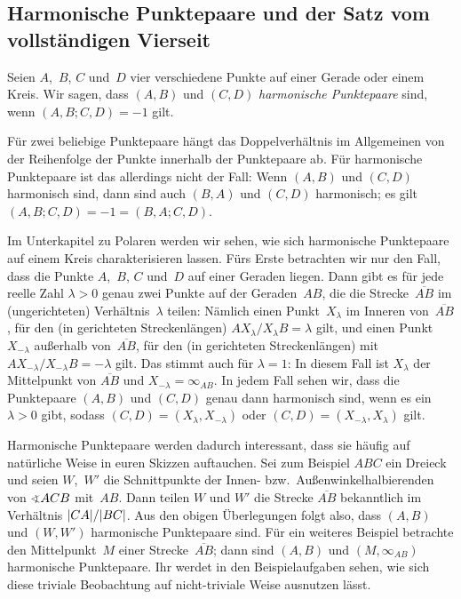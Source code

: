 \subsection*{Harmonische Punktepaare und der Satz vom vollständigen Vierseit}
\begin{definition}
	Seien $A$,~$B$, $C$ und~$D$ vier verschiedene Punkte auf einer Gerade oder einem Kreis. Wir sagen, dass $(A,B)$ und $(C,D)$ \emph{harmonische Punktepaare} sind, wenn $(A,B;C,D)=-1$ gilt.
\end{definition}

Für zwei beliebige Punktepaare hängt das Doppelverhältnis im Allgemeinen von der Reihenfolge der Punkte innerhalb der Punktepaare ab. Für harmonische Punktepaare ist das allerdings nicht der Fall: Wenn $(A,B)$ und $(C,D)$ harmonisch sind, dann sind auch $(B,A)$ und $(C,D)$ harmonisch; es gilt $(A,B;C,D)=-1=(B,A;C,D)$.

Im Unterkapitel zu Polaren werden wir sehen, wie sich harmonische Punktepaare auf einem Kreis charakterisieren lassen. Fürs Erste betrachten wir nur den Fall, dass die Punkte $A$,~$B$, $C$ und~$D$ auf einer Geraden liegen. Dann gibt es für jede reelle Zahl $\lambda>0$ genau zwei Punkte auf der Geraden~$AB$, die die Strecke~$\overline{AB}$ im (ungerichteten) Verhältnis~$\lambda$ teilen: Nämlich einen Punkt~$X_\lambda$ im Inneren von~$\overline{AB}$, für den (in gerichteten Streckenlängen) $AX_{\lambda}/X_{\lambda}B=\lambda$ gilt, und einen Punkt~$X_{-\lambda}$ außerhalb von~$\overline{AB}$, für den (in gerichteten Streckenlängen) mit $AX_{-\lambda}/X_{-\lambda}B=-\lambda$ gilt. Das stimmt auch für $\lambda=1$: In diesem Fall ist $X_\lambda$ der Mittelpunkt von $\overline{AB}$ und $X_{-\lambda}=\infty_{AB}$. In jedem Fall sehen wir, dass die Punktepaare $(A,B)$ und $(C,D)$ genau dann harmonisch sind, wenn es ein $\lambda >0$ gibt, sodass $(C,D)=(X_\lambda,X_{-\lambda})$ oder $(C,D)=(X_{-\lambda},X_\lambda)$ gilt.

Harmonische Punktepaare werden dadurch interessant, dass sie häufig auf natürliche Weise in euren Skizzen auftauchen. Sei zum Beispiel $ABC$ ein Dreieck und seien $W$,~$W'$ die Schnittpunkte der Innen- bzw.\ Außenwinkelhalbierenden von $\winkel ACB$ mit~$AB$. Dann teilen $W$ und $W'$ die Strecke $\overline{AB}$ bekanntlich im Verhältnis $\lvert CA\rvert/\lvert BC\rvert$. Aus den obigen Überlegungen folgt also, dass $(A,B)$ und $(W,W')$ harmonische Punktepaare sind. Für ein weiteres Beispiel betrachte den Mittelpunkt~$M$ einer Strecke~$\overline{AB}$; dann sind $(A,B)$ und $(M,\infty_{AB})$ harmonische Punktepaare. Ihr werdet in den Beispielaufgaben sehen, wie sich diese triviale Beobachtung auf nicht-triviale Weise ausnutzen lässt.

